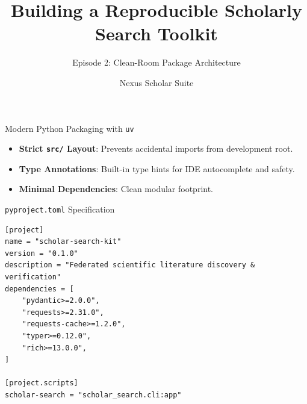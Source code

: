 \documentclass[aspectratio=169]{beamer}
\title{Building a Reproducible Scholarly Search Toolkit}
\subtitle{Episode 2: Clean-Room Package Architecture}
\author{Nexus Scholar Suite}
\date{}
\begin{document}
\begin{frame}[plain]
  \titlepage
\end{frame}

\begin{frame}{Modern Python Packaging with \texttt{uv}}
  \begin{center}
  \end{center}
  \vspace{0.4cm}
  \begin{itemize}
    \item \textbf{Strict \texttt{src/} Layout}: Prevents accidental imports from development root.
    \item \textbf{Type Annotations}: Built-in type hints for IDE autocomplete and safety.
    \item \textbf{Minimal Dependencies}: Clean modular footprint.
  \end{itemize}
\end{frame}

\begin{frame}[fragile]{\texttt{pyproject.toml} Specification}
\begin{lstlisting}[style=nexuspython]
[project]
name = "scholar-search-kit"
version = "0.1.0"
description = "Federated scientific literature discovery & verification"
dependencies = [
    "pydantic>=2.0.0",
    "requests>=2.31.0",
    "requests-cache>=1.2.0",
    "typer>=0.12.0",
    "rich>=13.0.0",
]

[project.scripts]
scholar-search = "scholar_search.cli:app"
\end{lstlisting}
\end{frame}
\end{document}
